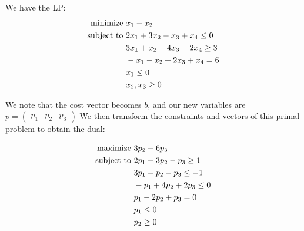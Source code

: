 We have the LP:
\begin{align}
    \text{minimize } &x_1 - x_2 \notag\\
    \text{subject to } &2x_1 + 3x_2 - x_3 + x_4 \leq 0 \notag\\
                    &3x_1 + x_2 + 4x_3 - 2x_4 \geq 3 \notag\\
                    &-x_1 - x_2 + 2x_3 + x_4 = 6\notag\\
                    & x_1 \leq 0\notag\\
                    & x_2, x_3 \geq 0\notag
\end{align}

We note that the cost vector becomes $b$, and our new variables are $p=\begin{pmatrix}p_1 & p_2 & p_3\end{pmatrix}$ We then transform the constraints and vectors of this primal problem to obtain the dual:

\begin{align}
    \text{maximize } &3p_2 + 6p_3 \notag\\
    \text{subject to } & 2p_1 + 3p_2 - p_3 \geq 1 \notag\\
                    & 3p_1 + p_2 - p_3 \leq -1 \notag\\
                    & -p_1 + 4p_2 + 2p_3 \leq 0\notag\\
                    & p_1 - 2p_2 + p_3 = 0\notag\\
                    & p_1 \leq 0\notag\\
                    & p_2 \geq 0\notag
\end{align}
